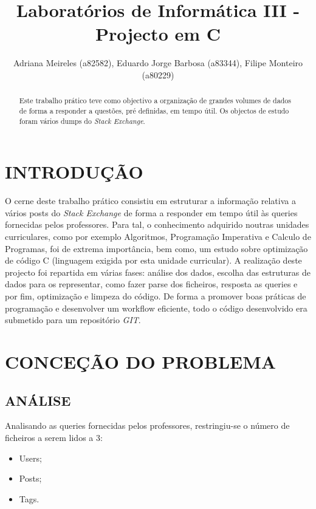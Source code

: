 \documentclass[letterpaper, 10 pt, conference]{IEEEtran}  %
\title{\LARGE \bf
Laboratórios de Informática III - Projecto em C
}
\author{Adriana Meireles (a82582), Eduardo Jorge Barbosa (a83344), Filipe Monteiro (a80229)%
}
\begin{document}
\maketitle
\thispagestyle{empty}
\pagestyle{empty}


\begin{abstract}

Este trabalho prático teve como objectivo a organização de grandes volumes de dados de forma a responder a questões, pré definidas, em tempo útil. Os objectos de estudo foram vários dumps do \textit{Stack Exchange}.

\end{abstract}


\section{INTRODUÇÃO}

O cerne deste trabalho prático consistiu em estruturar a informação relativa a vários posts do \textit{Stack Exchange} de forma a responder em tempo útil às queries fornecidas pelos professores. Para tal, o conhecimento adquirido noutras unidades curriculares, como por exemplo Algoritmos, Programação Imperativa e Calculo de Programas, foi de extrema importância, bem como, um estudo sobre optimização de código C (linguagem exigida por esta unidade curricular). A realização deste projecto foi repartida em várias fases: análise dos dados, escolha das estruturas de dados para os representar, como fazer parse dos ficheiros, resposta as queries e por fim, optimização e limpeza do código. De forma a promover boas práticas de programação e desenvolver um workflow eficiente, todo o código desenvolvido era submetido para um repositório \textit{GIT}.

\section{CONCEÇÃO DO PROBLEMA}

\subsection{ANÁLISE}

Analisando as queries fornecidas pelos professores, restringiu-se o número de ficheiros a serem lidos a 3:

\begin{itemize}
\item Users;
\item Posts;
\item Tags.
\end{itemize}
\end{document}
